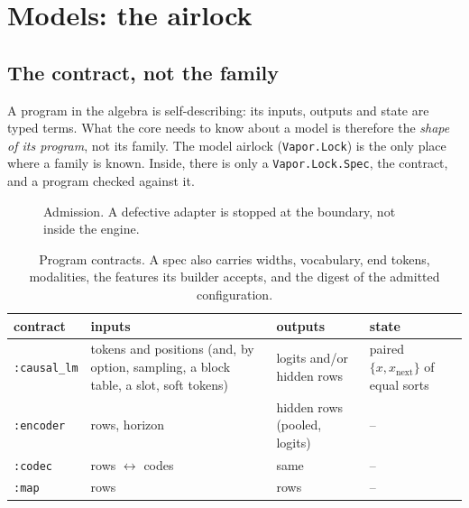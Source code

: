\chapter{Models: the airlock}\label{ch:models}

\section{The contract, not the family}

A program in the algebra is self-describing: its inputs, outputs and state are typed terms. What the
core needs to know about a model is therefore the \emph{shape of its program}, not its family. The model
airlock (\texttt{Vapor.Lock}) is the only place where a family is known. Inside, there is only a
\texttt{Vapor.Lock.Spec}, the contract, and a program checked against it.

\begin{figure}[h]
\centering
{}
\caption{Admission. A defective adapter is stopped at the boundary, not inside the engine.}
\end{figure}

\begin{table}[h]
\centering\small
\begin{tabularx}{\textwidth}{@{}lXXl@{}}
\toprule
contract & inputs & outputs & state \\
\midrule
\texttt{:causal\_lm} & tokens and positions (and, by option, sampling, a block table, a slot, soft tokens) & logits and/or hidden rows & paired $\{x, x_{\text{next}}\}$ of equal sorts \\
\texttt{:encoder} & rows, horizon & hidden rows (pooled, logits) & -- \\
\texttt{:codec} & rows $\leftrightarrow$ codes & same & -- \\
\texttt{:map} & rows & rows & -- \\
\bottomrule
\end{tabularx}
\caption{Program contracts. A spec also carries widths, vocabulary, end tokens, modalities, the features
its builder accepts, and the digest of the admitted configuration.}
\end{table}

